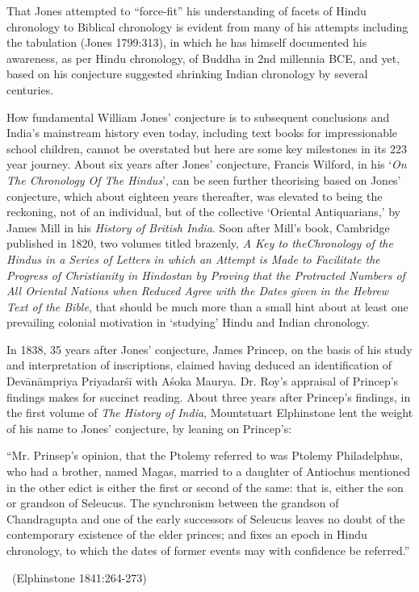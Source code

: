 That Jones attempted to “force-fit” his understanding of facets of Hindu chronology to Biblical chronology is evident from many of his attempts including the tabulation (Jones 1799:313), in which he has himself documented his awareness, as per Hindu chronology, of Buddha in 2nd millennia BCE, and yet, based on his conjecture suggested shrinking Indian chronology by several centuries.

How fundamental William Jones’ conjecture is to subsequent conclusions and India’s mainstream history even today, including text books for impressionable school children, cannot be overstated but here are some key milestones in its 223 year journey. About six years after Jones’ conjecture, Francis Wilford, in his ‘\textit{On The Chronology Of The Hindus}’, can be seen further theorising based on Jones’ conjecture, which about eighteen years thereafter, was elevated to being the reckoning, not of an individual, but of the collective ‘Oriental Antiquarians,’ by James Mill in his \textit{History of British India}. Soon after Mill’s book, Cambridge published in 1820, two volumes titled brazenly, \textit{A Key to the\break Chronology of the Hindus in a Series of Letters in which an Attempt is Made to Facilitate the Progress of Christianity in Hindostan by Proving that the Protracted Numbers of All Oriental Nations when Reduced Agree with the Dates given in the Hebrew Text of the Bible}, that should be much more than a small hint about at least one prevailing colonial motivation in ‘studying’ Hindu and Indian chronology.

In 1838, 35 years after Jones’ conjecture, James Princep, on the basis of his study and interpretation of inscriptions, claimed having deduced an identification of Devānāmpriya Priyadarśī with Aśoka Maurya. Dr. Roy’s appraisal of Princep’s findings makes for succinct reading. About three years after Princep’s findings, in the first volume of \textit{The History of India}, Mountstuart Elphinstone lent the weight of his name to Jones’ conjecture, by leaning on Princep’s:

\begin{myquote}
“Mr. Prinsep’s opinion, that the Ptolemy referred to was Ptolemy Philadelphus, who had a brother, named Magas, married to a daughter of Antiochus mentioned in the other edict is either the first or second of the same: that is, either the son or grandson of Seleucus. The synchronism between the grandson of Chandragupta and one of the early successors of Seleucus leaves no doubt of the contemporary existence of the elder princes; and fixes an epoch in Hindu chronology, to which the dates of former events may with confidence be referred.” 

~\hfill (Elphinstone 1841:264-273)
\end{myquote}

